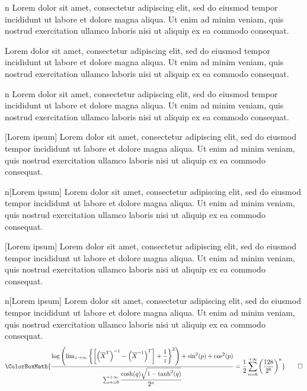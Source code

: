 \begin{axiom}{n}
	Lorem dolor sit amet, consectetur adipiscing elit, sed do eiusmod tempor incididunt ut labore et dolore magna aliqua. Ut enim ad minim veniam, quis nostrud exercitation ullamco laboris nisi ut aliquip ex ea commodo consequat.
\end{axiom}

\begin{principle}{}
	Lorem dolor sit amet, consectetur adipiscing elit, sed do eiusmod tempor incididunt ut labore et dolore magna aliqua. Ut enim ad minim veniam, quis nostrud exercitation ullamco laboris nisi ut aliquip ex ea commodo consequat.
\end{principle}

\begin{principle}{n}
	Lorem dolor sit amet, consectetur adipiscing elit, sed do eiusmod tempor incididunt ut labore et dolore magna aliqua. Ut enim ad minim veniam, quis nostrud exercitation ullamco laboris nisi ut aliquip ex ea commodo consequat.
\end{principle}

\begin{axiom}{}[Lorem ipsum]
	Lorem dolor sit amet, consectetur adipiscing elit, sed do eiusmod tempor incididunt ut labore et dolore magna aliqua. Ut enim ad minim veniam, quis nostrud exercitation ullamco laboris nisi ut aliquip ex ea commodo consequat.
\end{axiom}

\begin{axiom}{n}[Lorem ipsum]
	Lorem dolor sit amet, consectetur adipiscing elit, sed do eiusmod tempor incididunt ut labore et dolore magna aliqua. Ut enim ad minim veniam, quis nostrud exercitation ullamco laboris nisi ut aliquip ex ea commodo consequat.
\end{axiom}

\begin{principle}{}[Lorem ipsum]
	Lorem dolor sit amet, consectetur adipiscing elit, sed do eiusmod tempor incididunt ut labore et dolore magna aliqua. Ut enim ad minim veniam, quis nostrud exercitation ullamco laboris nisi ut aliquip ex ea commodo consequat.
\end{principle}

\begin{principle}{n}[Lorem ipsum]
	Lorem dolor sit amet, consectetur adipiscing elit, sed do eiusmod tempor incididunt ut labore et dolore magna aliqua. Ut enim ad minim veniam, quis nostrud exercitation ullamco laboris nisi ut aliquip ex ea commodo consequat.
	\begin{equation*}
		\ColorBoxMath{\dfrac{\log\left(\lim_{z\to\infty}\left\{\left[\left(\overline{X}^{T}\right)^{-1}-\left(\overline{X}^{-1}\right)^T\right]+\dfrac{1}{z}\right\}^2\right)+\sin^2(p)+\cos^2(p)}{\sum_{n=0}^{+\infty}\dfrac{\cosh(q)\sqrt{1-\tanh^2(q)}}{2^n}}=\dfrac{1}{2}\sum_{n=0}^{+\infty}\left(\dfrac{128}{2^8}\right)^n}\qedhere
	\end{equation*}
\end{principle}

